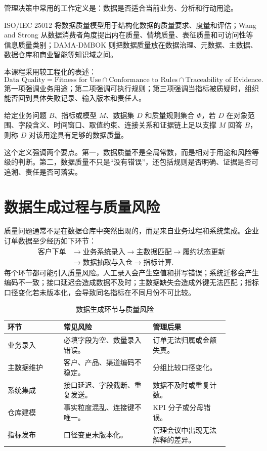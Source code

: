 \documentclass[UTF8,fontset=fandol,openany,zihao=-4]{ctexbook}
\begin{document}
管理决策中常用的工作定义是：数据是否适合当前业务、分析和行动用途。

ISO/IEC 25012 将数据质量模型用于结构化数据的质量要求、度量和评估；Wang and Strong 从数据消费者角度提出内在质量、情境质量、表征质量和可访问性等信息质量类别；DAMA-DMBOK 则把数据质量放在数据治理、元数据、主数据、数据仓库和商业智能等知识域之间。

本课程采用较工程化的表述：
\[
\text{Data Quality}
=
\text{Fitness for Use}
\cap
\text{Conformance to Rules}
\cap
\text{Traceability of Evidence}.
\]
第一项强调业务用途；第二项强调可执行规则；第三项强调当指标被质疑时，组织能否回到具体失败记录、输入版本和责任人。

\begin{definition}[用途适配的数据质量]
给定业务问题 \(B\)、指标或模型 \(M\)、数据集 \(D\) 和质量规则集合 \(\Phi\)，若 \(D\) 在对象范围、字段含义、时间窗口、取值约束、连接关系和证据链上足以支撑 \(M\) 回答 \(B\)，则称 \(D\) 对该用途具有足够的数据质量。
\end{definition}

这个定义强调两个要点。第一，数据质量不是全局常数，而是相对于用途和风险等级的判断。第二，数据质量不只是“没有错误”，还包括规则是否明确、证据是否可追溯、责任是否可落实。

\section{数据生成过程与质量风险}

质量问题通常不是在数据仓库中突然出现的，而是来自业务过程和系统集成。企业订单数据至少经历如下环节：
\[
\begin{aligned}
\text{客户下单}
&\rightarrow
\text{业务系统录入}
\rightarrow
\text{主数据匹配}
\rightarrow
\text{履约状态更新}\\
&\rightarrow
\text{数据抽取与入仓}
\rightarrow
\text{指标计算}.
\end{aligned}
\]
每个环节都可能引入质量风险。人工录入会产生空值和拼写错误；系统迁移会产生编码不一致；接口延迟会造成数据不及时；主数据缺失会造成外键无法匹配；指标口径变化若未版本化，会导致同名指标在不同月份不可比较。

\begin{table}[htbp]
\centering
\caption{数据生成环节与质量风险}
\begin{tabular}{>{\raggedright\arraybackslash}p{0.22\linewidth}>{\raggedright\arraybackslash}p{0.35\linewidth}>{\raggedright\arraybackslash}p{0.30\linewidth}}
\toprule
环节 & 常见风险 & 管理后果\\
\midrule
业务录入 & 必填字段为空、数量录入错误。 & 订单无法归属或金额失真。\\
主数据维护 & 客户、产品、渠道编码不稳定。 & 分组比较口径变化。\\
系统集成 & 接口延迟、字段截断、重复发送。 & 数据不及时或重复计数。\\
仓库建模 & 事实粒度混乱、连接键不唯一。 & KPI 分子或分母错误。\\
指标发布 & 口径变更未版本化。 & 管理会议中出现无法解释的差异。\\
\bottomrule
\end{tabular}
\end{table}
\end{document}
